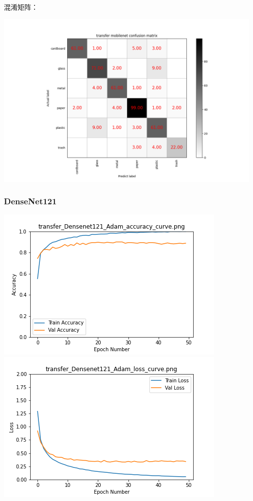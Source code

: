 \documentclass[UTF8]{ctexart}
\begin{document}
混淆矩阵：

\includegraphics[scale=0.5]{cm/mobile.png}

\subsubsection{DenseNet121}
 
\includegraphics[scale=0.5]{image/transfer_Densenet121_Adam_accuracy_curve.png} 
\includegraphics[scale=0.5]{image/transfer_Densenet121_Adam_loss_curve.png} 
\end{document}

